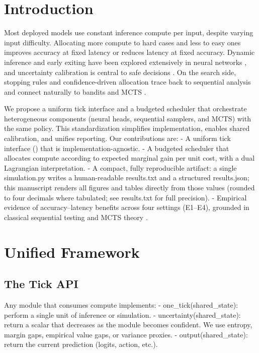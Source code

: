 \vspace{-0.5em}
\section{Introduction}
Most deployed models use constant inference compute per input, despite varying input difficulty. Allocating more compute to hard cases and less to easy ones improves accuracy at fixed latency or reduces latency at fixed accuracy. Dynamic inference and early exiting have been explored extensively in neural networks \cite{Graves2016ACT,Teerapittayanon2016BranchyNet,Huang2018MSDNet,Wang2018SkipNet,Kaya2019ShallowDeep,Xin2020DeeBERT,Liu2020FastBERT,Elbayad2020DepthAdaptive,NiculescuMizil2005Calib,Figurnov2017SACT,Bolukbasi2017Adaptive,Cai2020OFA,Xiao2021DynamicViT}, and uncertainty calibration is central to safe decisions \cite{Guo2017Calibration,Kendall2017Uncertainty,Gal2016DropoutBayes,Platt1999}. On the search side, stopping rules and confidence-driven allocation trace back to sequential analysis \cite{Wald1945Sequential} and connect naturally to bandits and MCTS \cite{Kocsis2006UCT,Coulom2006MCTS,Silver2017AlphaZero,Schrittwieser2020MuZero,LattimoreSzepesvari2020,Kalyanakrishnan2012PAC,Anthony2017ThinkingFast}. 

We propose a uniform tick interface and a budgeted scheduler that orchestrate heterogeneous components (neural heads, sequential samplers, and MCTS) with the same policy. This standardization simplifies implementation, enables shared calibration, and unifies reporting. Our contributions are:
- A uniform tick interface (\TickAPI) that is implementation-agnostic.
- A budgeted scheduler that allocates compute according to expected marginal gain per unit cost, with a dual Lagrangian interpretation.
- A compact, fully reproducible artifact: a single simulation.py writes a human-readable results.txt and a structured results.json; this manuscript renders all figures and tables directly from those values (rounded to four decimals where tabulated; see results.txt for full precision).
- Empirical evidence of accuracy--latency benefits across four settings (E1--E4), grounded in classical sequential testing \cite{Wald1945Sequential} and MCTS theory \cite{Kocsis2006UCT,Coulom2006MCTS}.

\section{Unified Framework}
\label{sec:framework}
\subsection{The Tick API}
Any module that consumes compute implements:
- one\_tick(shared\_state): perform a single unit of inference or simulation.
- uncertainty(shared\_state): return a scalar that decreases as the module becomes confident. We use entropy, margin gaps, empirical value gaps, or variance proxies.
- output(shared\_state): return the current prediction (logits, action, etc.).

